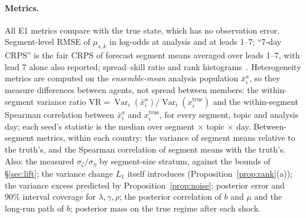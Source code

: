 \documentclass[10pt]{article}
\theoremstyle{remark}
\newcommand{\Var}{\operatorname{Var}}
\begin{document}
\paragraph{Metrics.} All E1 metrics compare with the true state, which has no observation error. Segment-level RMSE of $\mu_{s,k}$ in log-odds at analysis and at leads 1--7; ``7-day CRPS'' is the fair CRPS of forecast segment means averaged over leads 1--7, with lead 7 alone also reported; spread--skill ratio and rank histograms~\cite{hamill2001}. Heterogeneity metrics are computed on the \emph{ensemble-mean} analysis population $\bar x^a_i$, so they measure differences between agents, not spread between members: the within-segment variance ratio $\mathrm{VR}=\Var_i(\bar x^a_i)/\Var_i(x^{\mathrm{true}}_i)$ and the within-segment Spearman correlation between $\bar x^a_i$ and $x^{\mathrm{true}}_i$, for every segment, topic and analysis day; each seed's statistic is the median over segment $\times$ topic $\times$ day. Between-segment metrics, within each country: the variance of segment means relative to the truth's, and the Spearman correlation of segment means with the truth's. Also: the measured $\sigma_\zeta/\sigma_\eta$ by segment-size stratum, against the bounds of \S\ref{sec:lift}; the variance change $L_1$ itself introduces (Proposition~\ref{prop:rank}(a)); the variance excess predicted by Proposition~\ref{prop:noise}; posterior error and 90\% interval coverage for $\lambda,\gamma,\rho$; the posterior correlation of $b$ and $\mu$ and the long-run path of $b$; posterior mass on the true regime after each shock.
\end{document}
